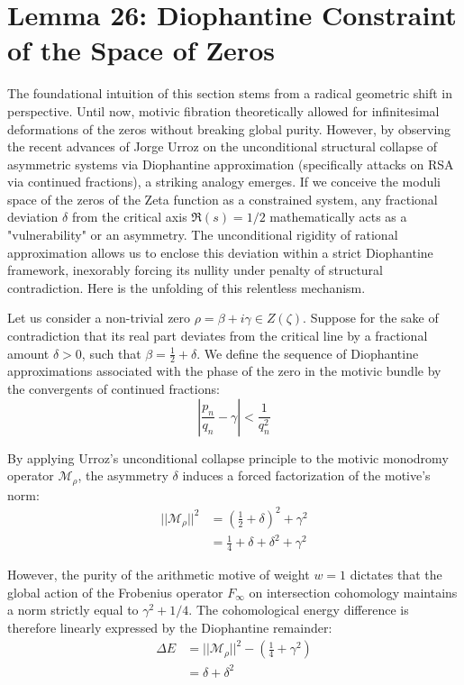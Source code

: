\documentclass[
]{article}
\begin{document}
\section{Lemma 26: Diophantine Constraint of the Space of Zeros}

The foundational intuition of this section stems from a radical geometric shift in perspective. Until now, motivic fibration theoretically allowed for infinitesimal deformations of the zeros without breaking global purity. However, by observing the recent advances of Jorge Urroz \cite{urroz2026rsa} on the unconditional structural collapse of asymmetric systems via Diophantine approximation (specifically attacks on RSA via continued fractions), a striking analogy emerges. If we conceive the moduli space of the zeros of the Zeta function as a constrained system, any fractional deviation $\delta$ from the critical axis $\Re(s) = 1/2$ mathematically acts as a "vulnerability" or an asymmetry. The unconditional rigidity of rational approximation allows us to enclose this deviation within a strict Diophantine framework, inexorably forcing its nullity under penalty of structural contradiction. Here is the unfolding of this relentless mechanism.

Let us consider a non-trivial zero $\rho = \beta + i\gamma \in Z(\zeta)$. Suppose for the sake of contradiction that its real part deviates from the critical line by a fractional amount $\delta > 0$, such that $\beta = \frac{1}{2} + \delta$.
We define the sequence of Diophantine approximations associated with the phase of the zero in the motivic bundle by the convergents of continued fractions:
\begin{equation*}
\left| \frac{p_n}{q_n} - \gamma \right| < \frac{1}{q_n^2}
\end{equation*}

By applying Urroz's unconditional collapse principle to the motivic monodromy operator $\mathcal{M}_\rho$, the asymmetry $\delta$ induces a forced factorization of the motive's norm:
\begin{align*}
|| \mathcal{M}_\rho ||^2 &= \left( \frac{1}{2} + \delta \right)^2 + \gamma^2 \\
&= \frac{1}{4} + \delta + \delta^2 + \gamma^2
\end{align*}

However, the purity of the arithmetic motive of weight $w=1$ dictates that the global action of the Frobenius operator $F_\infty$ on intersection cohomology maintains a norm strictly equal to $\gamma^2 + 1/4$.
The cohomological energy difference is therefore linearly expressed by the Diophantine remainder:
\begin{align*}
\Delta E &= || \mathcal{M}_\rho ||^2 - \left( \frac{1}{4} + \gamma^2 \right) \\
&= \delta + \delta^2
\end{align*}
\end{document}
